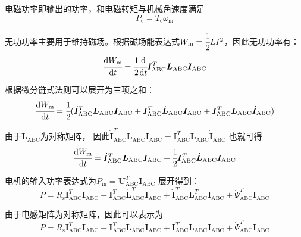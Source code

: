 电磁功率即输出的功率，和电磁转矩与机械角速度满足
\begin{equation*}
    P_{\mathrm{e}}=T_{\mathrm{e}}\omega_{\mathrm{m}}
\end{equation*}

无功功率主要用于维持磁场。根据磁场能表达式\(W_{\mathrm{m}}=\cfrac 12 LI^2\)，因此无功功率有：
\begin{equation*}
    \cfrac{\mathrm{d} W_{\mathrm{m}}}{\mathrm{d} t}=\cfrac 12
\cfrac{\mathrm{d}}{\mathrm{d} t}\bm{I}^T_{\mathrm{ABC}}\bm{L}_{\mathrm{ABC}}\bm{I}_{\mathrm{ABC}}
\end{equation*}

根据微分链式法则可以展开为三项之和：
\begin{equation*}
    \cfrac{\mathrm{d} W_{\mathrm{m}}}{\mathrm{d} t}=
\cfrac 12
(\dot{\bm{I}}^T_{\mathrm{ABC}}\bm{L}_{\mathrm{ABC}}\bm{I}_{\mathrm{ABC}}+
\bm{I}^T_{\mathrm{ABC}}\dot{\bm{L}}_{\mathrm{ABC}}\bm{I}_{\mathrm{ABC}}+
\bm{I}^T_{\mathrm{ABC}}\bm{L}_{\mathrm{ABC}}\dot{\bm{I}}_{\mathrm{ABC}})
\end{equation*}

由于\(\bm{L}_{\mathrm{ABC}}\)为对称矩阵，
因此\(\dot{\bm{I}}^T_{\mathrm{ABC}}\bm{L}_{\mathrm{ABC}}\bm{I}_{\mathrm{ABC}}
=\bm{I}^T_{\mathrm{ABC}}\bm{L}_{\mathrm{ABC}}\dot{\bm{I}}_{\mathrm{ABC}}\)
也就可得
\begin{equation*}
    \cfrac{\mathrm{d} W_{\mathrm{m}}}{\mathrm{d} t}=
\dot{\bm{I}}^T_{\mathrm{ABC}}\bm{L}_{\mathrm{ABC}}\bm{I}_{\mathrm{ABC}}+
\cfrac 12\bm{I}^T_{\mathrm{ABC}}\dot{\bm{L}}_{\mathrm{ABC}}\bm{I}_{\mathrm{ABC}}
\end{equation*}

电机的输入功率表达式为\(P_{\mathrm{in}}=\bm{U}_{\mathrm{ABC}}^T\bm{I}_{\mathrm{ABC}}\)
展开得到：
\begin{equation*}
    P=R_{\mathrm{s}}\bm{I}^T_{\mathrm{ABC}}\bm{I}_{\mathrm{ABC}}+\bm{I}^T_{\mathrm{ABC}}
\dot{\bm{L}}^T_{\mathrm{ABC}}\bm{I}_{\mathrm{ABC}}+\dot{\bm{I}}^T_{\mathrm{ABC}}
\bm{L}^T_{\mathrm{ABC}}\bm{I}_{\mathrm{ABC}}+\dot{\bm{\varPsi}}^T_{\mathrm{ABC}}\bm{I}_{\mathrm{ABC}}
\end{equation*}

由于电感矩阵为对称矩阵，因此可以表示为
\begin{equation*}
    P=R_{\mathrm{s}}\bm{I}^T_{\mathrm{ABC}}\bm{I}_{\mathrm{ABC}}+
    \bm{I}^T_{\mathrm{ABC}}\dot{\bm{L}}_{\mathrm{ABC}}\bm{I}_{\mathrm{ABC}}+
    {\bm{I}}^T_{\mathrm{ABC}}\bm{L}_{\mathrm{ABC}}\bm{I}_{\mathrm{ABC}}+
    \dot{\bm{\varPsi}}^T_{\mathrm{ABC}}\bm{I}_{\mathrm{ABC}}  
\end{equation*}

